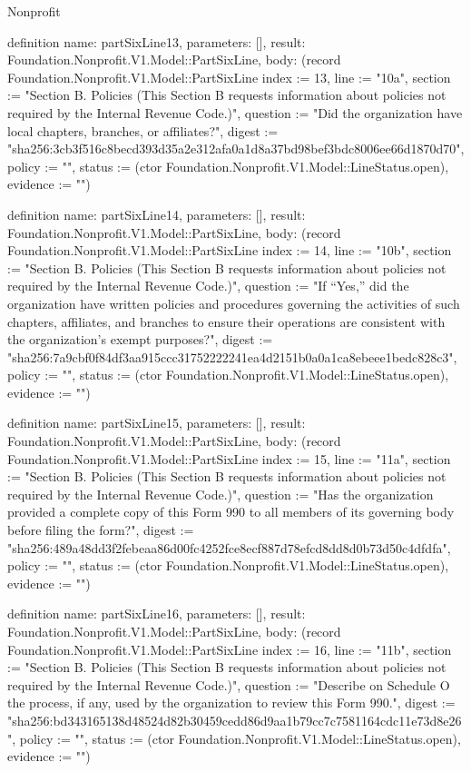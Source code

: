 \begin{lexlean}{Nonprofit}
\begin{semanticmodule}
definition{
  name: partSixLine13,
  parameters: [],
  result: Foundation.Nonprofit.V1.Model::PartSixLine,
  body: (record Foundation.Nonprofit.V1.Model::PartSixLine {index := 13, line := "10a", section := "Section B. Policies (This Section B requests information about policies not required by the Internal Revenue Code.)", question := "Did the organization have local chapters, branches, or affiliates?", digest := "sha256:3cb3f516c8becd393d35a2e312afa0a1d8a37bd98bef3bdc8006ee66d1870d70", policy := "", status := (ctor Foundation.Nonprofit.V1.Model::LineStatus.open), evidence := ""})
}

definition{
  name: partSixLine14,
  parameters: [],
  result: Foundation.Nonprofit.V1.Model::PartSixLine,
  body: (record Foundation.Nonprofit.V1.Model::PartSixLine {index := 14, line := "10b", section := "Section B. Policies (This Section B requests information about policies not required by the Internal Revenue Code.)", question := "If “Yes,” did the organization have written policies and procedures governing the activities of such chapters, affiliates, and branches to ensure their operations are consistent with the organization’s exempt purposes?", digest := "sha256:7a9cbf0f84df3aa915ccc31752222241ea4d2151b0a0a1ca8ebeee1bedc828c3", policy := "", status := (ctor Foundation.Nonprofit.V1.Model::LineStatus.open), evidence := ""})
}

definition{
  name: partSixLine15,
  parameters: [],
  result: Foundation.Nonprofit.V1.Model::PartSixLine,
  body: (record Foundation.Nonprofit.V1.Model::PartSixLine {index := 15, line := "11a", section := "Section B. Policies (This Section B requests information about policies not required by the Internal Revenue Code.)", question := "Has the organization provided a complete copy of this Form 990 to all members of its governing body before filing the form?", digest := "sha256:489a48dd3f2febeaa86d00fc4252fce8ecf887d78efcd8dd8d0b73d50c4dfdfa", policy := "", status := (ctor Foundation.Nonprofit.V1.Model::LineStatus.open), evidence := ""})
}

definition{
  name: partSixLine16,
  parameters: [],
  result: Foundation.Nonprofit.V1.Model::PartSixLine,
  body: (record Foundation.Nonprofit.V1.Model::PartSixLine {index := 16, line := "11b", section := "Section B. Policies (This Section B requests information about policies not required by the Internal Revenue Code.)", question := "Describe on Schedule O the process, if any, used by the organization to review this Form 990.", digest := "sha256:bd343165138d48524d82b30459cedd86d9aa1b79cc7c7581164cdc11e73d8e26", policy := "", status := (ctor Foundation.Nonprofit.V1.Model::LineStatus.open), evidence := ""})
}


\end{semanticmodule}
\end{lexlean}
